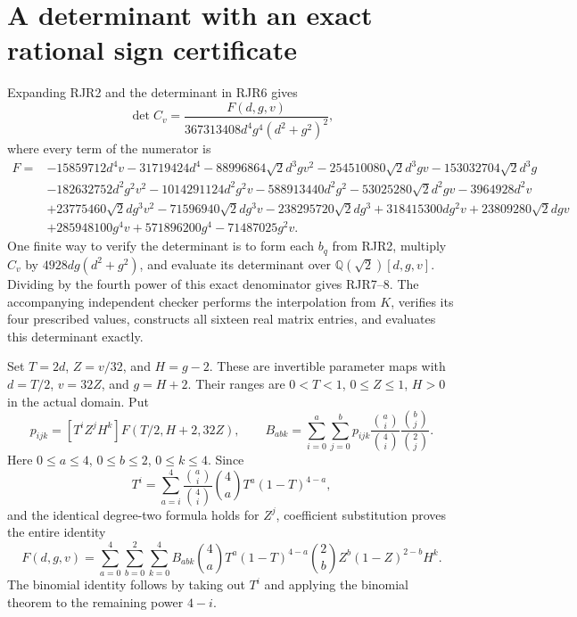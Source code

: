 \documentclass[11pt]{article}
\begin{document}
\section{A determinant with an exact rational sign certificate}
Expanding RJR2 and the determinant in RJR6 gives
\[
 \det C_v=\frac{F(d,g,v)}{367313408d^4g^4(d^2+g^2)^2},
 \tag{RJR7}
\]
where every term of the numerator is
\[
\begin{aligned}
F={}&-15859712d^4v-31719424d^4
 -88996864\sqrt2d^3gv^2-254510080\sqrt2d^3gv
 -153032704\sqrt2d^3g\\
&-182632752d^2g^2v^2-1014291124d^2g^2v
 -588913440d^2g^2-53025280\sqrt2d^2gv-3964928d^2v\\
&+23775460\sqrt2dg^3v^2-71596940\sqrt2dg^3v
 -238295720\sqrt2dg^3+318415300dg^2v
 +23809280\sqrt2dgv\\
&+285948100g^4v+571896200g^4-71487025g^2v.
\end{aligned}\tag{RJR8}
\]
One finite way to verify the determinant is to form each $b_q$ from
RJR2, multiply $C_v$ by $4928dg(d^2+g^2)$, and evaluate its
determinant over $\mathbb Q(\sqrt2)[d,g,v]$. Dividing by the fourth
power of this exact denominator gives RJR7--8. The accompanying
independent checker performs the interpolation from $K$, verifies
its four prescribed values, constructs all sixteen real matrix
entries, and evaluates this determinant exactly.

Set $T=2d$, $Z=v/32$, and $H=g-2$. These are invertible parameter
maps with $d=T/2$, $v=32Z$, and $g=H+2$. Their ranges are
$0<T<1$, $0\le Z\le1$, $H>0$ in the actual domain. Put
\[
 p_{ijk}=[T^iZ^jH^k]F(T/2,H+2,32Z),\qquad
 B_{abk}=\sum_{i=0}^a\sum_{j=0}^b p_{ijk}
 \frac{\binom ai}{\binom4i}\frac{\binom bj}{\binom2j}.
 \tag{RJR9}
\]
Here $0\le a\le4$, $0\le b\le2$, $0\le k\le4$. Since
\[
 T^i=\sum_{a=i}^4\frac{\binom ai}{\binom4i}
      \binom4aT^a(1-T)^{4-a},
\]
and the identical degree-two formula holds for $Z^j$, coefficient
substitution proves the entire identity
\[
 F(d,g,v)=\sum_{a=0}^4\sum_{b=0}^2\sum_{k=0}^4 B_{abk}
 \binom4aT^a(1-T)^{4-a}\binom2bZ^b(1-Z)^{2-b}H^k.
 \tag{RJR10}
\]
The binomial identity follows by taking out $T^i$ and applying
the binomial theorem to the remaining power $4-i$.
\end{document}
